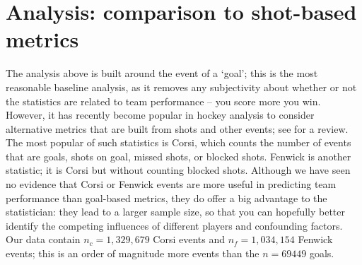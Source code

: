 \section{Analysis: comparison to shot-based metrics}
\label{sec:shots}


The analysis above is built around the event of a `goal'; this is the most
reasonable baseline analysis, as it removes any subjectivity about whether or
not the statistics are related to team performance -- you score more you win.
However, it has recently become popular in hockey analysis to consider
alternative metrics that are built from shots and other events; see
\cite{vol10} for a review. The most popular of such statistics is Corsi, which
counts the number of events that are goals, shots on goal, missed shots, or
blocked shots.  Fenwick is another statistic; it is Corsi but without counting
blocked shots.  Although we have seen no evidence that Corsi or Fenwick events
are more useful in predicting team performance than goal-based metrics, they
do offer a big advantage to the statistician: they lead to a larger sample
size, so that you can hopefully better identify the competing influences of
different players and confounding factors. Our data contain
$n_{c}=1,329,679$ Corsi events and $n_{f}=1,034,154$ Fenwick events; this is
an order of magnitude more events than the $n=69449$ goals.


